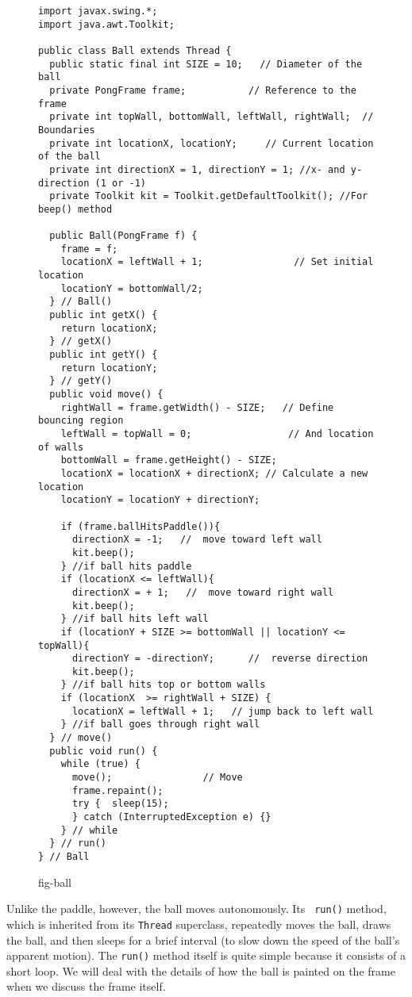 \begin{figure}[p]
\jjjprogstart
\begin{jjjlisting}[34.5pc]
\begin{lstlisting}
import javax.swing.*;
import java.awt.Toolkit;

public class Ball extends Thread {
  public static final int SIZE = 10;   // Diameter of the ball
  private PongFrame frame;           // Reference to the frame
  private int topWall, bottomWall, leftWall, rightWall;  // Boundaries
  private int locationX, locationY;     // Current location of the ball
  private int directionX = 1, directionY = 1; //x- and y-direction (1 or -1)
  private Toolkit kit = Toolkit.getDefaultToolkit(); //For beep() method

  public Ball(PongFrame f) {
    frame = f;
    locationX = leftWall + 1;                // Set initial location
    locationY = bottomWall/2;
  } // Ball()
  public int getX() {
    return locationX;
  } // getX()
  public int getY() {
    return locationY;
  } // getY()
  public void move() {
    rightWall = frame.getWidth() - SIZE;   // Define bouncing region
    leftWall = topWall = 0;                 // And location of walls
    bottomWall = frame.getHeight() - SIZE;
    locationX = locationX + directionX; // Calculate a new location
    locationY = locationY + directionY;

    if (frame.ballHitsPaddle()){
      directionX = -1;   //  move toward left wall
      kit.beep();
    } //if ball hits paddle
    if (locationX <= leftWall){
      directionX = + 1;   //  move toward right wall
      kit.beep();
    } //if ball hits left wall
    if (locationY + SIZE >= bottomWall || locationY <= topWall){
      directionY = -directionY;      //  reverse direction
      kit.beep();
    } //if ball hits top or bottom walls
    if (locationX  >= rightWall + SIZE) {
      locationX = leftWall + 1;   // jump back to left wall
    } //if ball goes through right wall
  } // move()
  public void run() {
    while (true) {
      move();                // Move
      frame.repaint();
      try {  sleep(15);
      } catch (InterruptedException e) {}
    } // while
  } // run()
} // Ball
\end{lstlisting}
\end{jjjlisting}
{fig-ball}
\end{figure}

Unlike the paddle, however, the ball moves autonomously.  Its {\tt
run()} method, which is inherited from its {\tt Thread} superclass,
repeatedly moves the ball, draws the ball, and then sleeps for a brief
interval (to slow down the speed of the ball's apparent motion).  The
{\tt run()} method itself is quite simple because it consists of a
short loop.  We will deal with the details of how the ball is painted
on the frame when we discuss the frame itself.

